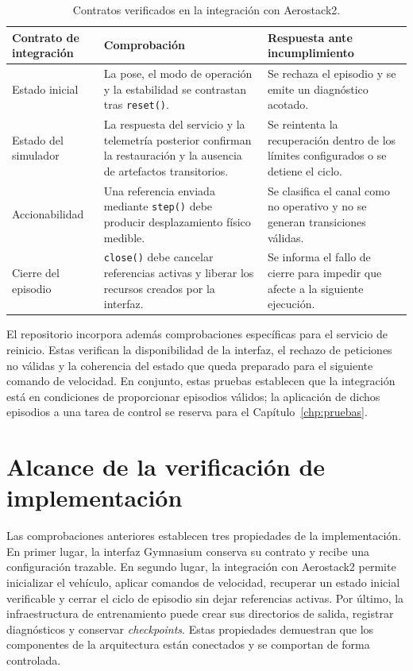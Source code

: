 \begin{table}[H]
\centering
\small
\setlength{\tabcolsep}{3pt}
\renewcommand{\arraystretch}{1.15}
\begin{tabular}{p{} p{} p{}}
\hline
\textbf{Contrato de integración} & \textbf{Comprobación} & \textbf{Respuesta ante incumplimiento} \\
\hline
Estado inicial & La pose, el modo de operación y la estabilidad se contrastan tras \texttt{reset()}. & Se rechaza el episodio y se emite un diagnóstico acotado. \\
Estado del simulador & La respuesta del servicio y la telemetría posterior confirman la restauración y la ausencia de artefactos transitorios. & Se reintenta la recuperación dentro de los límites configurados o se detiene el ciclo. \\
Accionabilidad & Una referencia enviada mediante \texttt{step()} debe producir desplazamiento físico medible. & Se clasifica el canal como no operativo y no se generan transiciones válidas. \\
Cierre del episodio & \texttt{close()} debe cancelar referencias activas y liberar los recursos creados por la interfaz. & Se informa el fallo de cierre para impedir que afecte a la siguiente ejecución. \\
\hline
\end{tabular}
\caption{Contratos verificados en la integración con Aerostack2.}
\label{tab:pruebas:fallos_control}
\end{table}

El repositorio incorpora además comprobaciones específicas para el servicio de
reinicio. Estas verifican la disponibilidad de la interfaz, el rechazo de
peticiones no válidas y la coherencia del estado que queda preparado para el
siguiente comando de velocidad. En conjunto, estas pruebas establecen que la
integración está en condiciones de proporcionar episodios válidos; la aplicación
de dichos episodios a una tarea de control se reserva para el
Capítulo~\ref{chp:pruebas}.

\section{Alcance de la verificación de implementación}
\label{sct:resultados:validacion}

Las comprobaciones anteriores establecen tres propiedades de la implementación.
En primer lugar, la interfaz Gymnasium conserva su contrato y recibe una
configuración trazable. En segundo lugar, la integración con Aerostack2 permite
inicializar el vehículo, aplicar comandos de velocidad, recuperar un estado
inicial verificable y cerrar el ciclo de episodio sin dejar referencias activas.
Por último, la infraestructura de entrenamiento puede crear sus directorios de
salida, registrar diagnósticos y conservar \emph{checkpoints}. Estas propiedades
demuestran que los componentes de la arquitectura están conectados y se comportan de
forma controlada.

